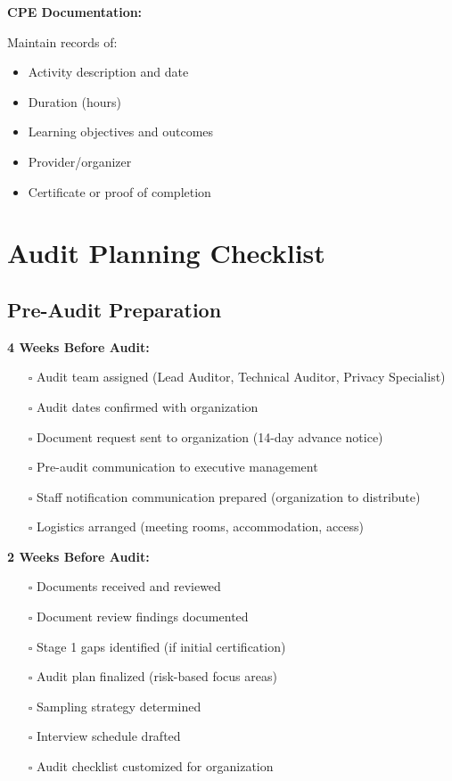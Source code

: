 \documentclass[11pt,a4paper]{article}
\begin{document}
\textbf{CPE Documentation:}

Maintain records of:
\begin{itemize}
\item Activity description and date
\item Duration (hours)
\item Learning objectives and outcomes
\item Provider/organizer
\item Certificate or proof of completion
\end{itemize}

\appendix

\section{Audit Planning Checklist}

\subsection{Pre-Audit Preparation}

\textbf{4 Weeks Before Audit:}

\begin{itemize}
\item[$\square$] Audit team assigned (Lead Auditor, Technical Auditor, Privacy Specialist)
\item[$\square$] Audit dates confirmed with organization
\item[$\square$] Document request sent to organization (14-day advance notice)
\item[$\square$] Pre-audit communication to executive management
\item[$\square$] Staff notification communication prepared (organization to distribute)
\item[$\square$] Logistics arranged (meeting rooms, accommodation, access)
\end{itemize}

\textbf{2 Weeks Before Audit:}

\begin{itemize}
\item[$\square$] Documents received and reviewed
\item[$\square$] Document review findings documented
\item[$\square$] Stage 1 gaps identified (if initial certification)
\item[$\square$] Audit plan finalized (risk-based focus areas)
\item[$\square$] Sampling strategy determined
\item[$\square$] Interview schedule drafted
\item[$\square$] Audit checklist customized for organization
\end{itemize}
\end{document}
